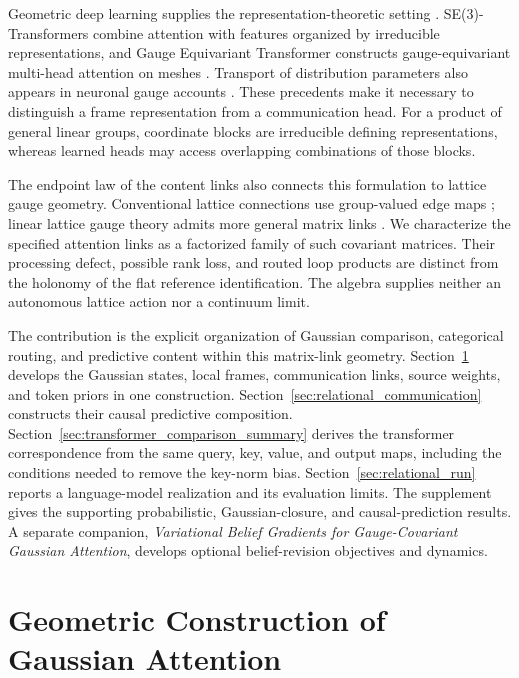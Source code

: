 \documentclass[twoside,11pt]{article}
\begin{document}
Geometric deep learning supplies the representation-theoretic setting \citep{cohen2019gauge,bronstein2021geometric}. SE(3)-Transformers combine attention with features organized by irreducible representations, and Gauge Equivariant Transformer constructs gauge-equivariant multi-head attention on meshes \citep{fuchs2020se3,He2021GaugeEquivariantTransformer}. Transport of distribution parameters also appears in neuronal gauge accounts \citep{Sengupta2016NeuronalGauge,sengupta2017gauge}. These precedents make it necessary to distinguish a frame representation from a communication head. For a product of general linear groups, coordinate blocks are irreducible defining representations, whereas learned heads may access overlapping combinations of those blocks.

The endpoint law of the content links also connects this formulation to lattice gauge geometry. Conventional lattice connections use group-valued edge maps \citep{WilsonConfinement1974}; linear lattice gauge theory admits more general matrix links \citep{Wetterich2014LinearLattice}. We characterize the specified attention links as a factorized family of such covariant matrices. Their processing defect, possible rank loss, and routed loop products are distinct from the holonomy of the flat reference identification. The algebra supplies neither an autonomous lattice action nor a continuum limit.

The contribution is the explicit organization of Gaussian comparison, categorical routing, and predictive content within this matrix-link geometry. Section~\ref{sec:construction_overview} develops the Gaussian states, local frames, communication links, source weights, and token priors in one construction. Section~\ref{sec:relational_communication} constructs their causal predictive composition. Section~\ref{sec:transformer_comparison_summary} derives the transformer correspondence from the same query, key, value, and output maps, including the conditions needed to remove the key-norm bias. Section~\ref{sec:relational_run} reports a language-model realization and its evaluation limits. The supplement gives the supporting probabilistic, Gaussian-closure, and causal-prediction results. A separate companion, \emph{Variational Belief Gradients for Gauge-Covariant Gaussian Attention}, develops optional belief-revision objectives and dynamics.

\section{Geometric Construction of Gaussian Attention}
\label{sec:construction_overview}
\label{sec:free_energy_section}
\end{document}

